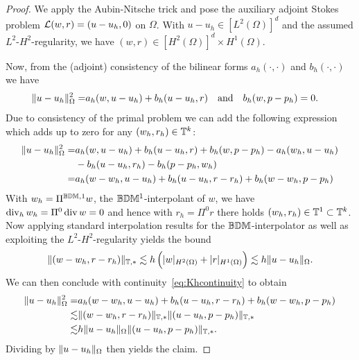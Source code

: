 \documentclass[sn-mathphys,Numbered]{sn-jnl}%
\theoremstyle{remark}%
\theoremstyle{definition}%
\begin{document}
  \begin{proof}
    We apply the Aubin-Nitsche trick and pose the auxiliary adjoint Stokes problem $\mathcal{L}(w,r) =
    (u-u_h,0)$ on $\Omega$. With $u-u_h \in [L^2(\Omega)]^d$ and the assumed
    $L^2$-$H^2$-regularity, we have $(w,r) \in [H^2(\Omega)]^d \times H^1(\Omega)$.

    Now, from the (adjoint) consistency of the bilinear forms
    $a_h(\cdot,\cdot)$ and $b_h(\cdot,\cdot)$ we have
    \begin{align*}
      \Vert u-u_h \Vert_{\Omega}^2
      =&a_h(w,u-u_h) + b_h(u-u_h,r) \quad\text{and}\quad b_h(w,p-p_h) = 0.
    \end{align*}      
    Due to consistency of the primal problem we can add the following expression which adds up to zero for any $(w_h,r_h) \in \mathbb{T}^k$:
    \begin{align*}
      \nrm{u-u_h}_{\Omega}^2 =&a_h(w,u-u_h) + b_h(u-u_h,r) + b_h(w, p-p_h) 
       - a_h(w_h,u-u_h) \\ & -b_h(u-u_h,r_h) - b_h(p-p_h,w_h) 
        \\ %
         =&a_h(w-w_h,u-u_h) + b_h(u-u_h,r-r_h) + b_h(w-w_h, p-p_h) %
    \end{align*}
    With $w_h = \Pi^{\mathbb{B}\mathbb{D}\mathbb{M},1} w$, the $\mathbb{B}\mathbb{D}\mathbb{M}^1$-interpolant of $w$, we have
    $\operatorname{\mathrm{div}}_h w_h = \Pi^0 \operatorname{\mathrm{div}} w = 0$ and hence with $r_h = \Pi^0 r$ there holds
    $(w_h,r_h) \in \mathbb{T}^1 \subset \mathbb{T}^k$. 
    Now applying
    standard interpolation results for the $\mathbb{B}\mathbb{D}\mathbb{M}$-interpolator as well as exploiting the $L^2$-$H^2$-regularity yields the bound 
    $$ \Vert  (w-w_h,r-r_h)  \Vert_{\mathbb{T},\ast} \lesssim h \left( \vert w \vert_{H^2(\Omega)} +
      \vert r \vert_{H^1(\Omega)} \right) \lesssim h \Vert u-u_h \Vert_{\Omega}.$$
    We can then conclude with continuity~\eqref{eq:Khcontinuity} to obtain
    \begin{align*}
      \Vert u-u_h \Vert_{\Omega}^2
      =&a_h(w-w_h,u-u_h) + b_h(u-u_h,r-r_h) + b_h(w-w_h, p-p_h) \\
      \lesssim&  \Vert  (w-w_h,r-r_h)  \Vert_{\mathbb{T},\ast} \Vert  (u-u_h,p-p_h)  \Vert_{\mathbb{T},\ast}
      \\
      \lesssim&  h \Vert u-u_h \Vert_{\Omega} \Vert  (u-u_h,p-p_h)  \Vert_{\mathbb{T},\ast}.
    \end{align*}
    Dividing by $\Vert u-u_h \Vert_{\Omega}$ then yields the claim.
    \end{proof}
\end{document}
